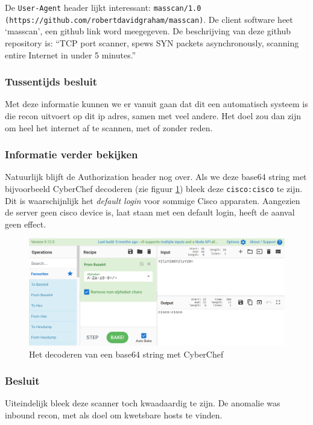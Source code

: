 \documentclass[a4paper,12pt]{report}
\begin{document}
De \lstinline|User-Agent| header lijkt interessant: \lstinline|masscan/1.0 (https://github.com/robertdavidgraham/masscan)|.
De client software heet `masscan', een github link word meegegeven.
De beschrijving van deze github repository is: ``TCP port scanner, spews SYN packets asynchronously, scanning entire Internet in under 5 minutes.''

\subsubsection{Tussentijds besluit}
Met deze informatie kunnen we er vanuit gaan dat dit een automatisch systeem is die recon uitvoert op dit ip adres, samen met veel andere.
Het doel zou dan zijn om heel het internet af te scannen, met of zonder reden.

\subsubsection{Informatie verder bekijken}
Natuurlijk blijft de Authorization header nog over.
Als we deze base64 string met bijvoorbeeld CyberChef decoderen (zie figuur \ref{fig:analyse-masscan-cyberchef}) bleek deze \lstinline|cisco:cisco| te zijn.
Dit is waarschijnlijk het \emph{default login} voor sommige Cisco apparaten.
Aangezien de server geen cisco device is, laat staan met een default login, heeft de aanval geen effect.

\begin{figure}[H]
  \centering
  \includegraphics[width=\textwidth]{analyse-masscan-cyberchef}
  \caption{Het decoderen van een base64 string met CyberChef}
  \label{fig:analyse-masscan-cyberchef}
\end{figure}

\subsubsection{Besluit}
Uiteindelijk bleek deze scanner toch kwaadaardig te zijn.
De anomalie was inbound recon, met als doel om kwetsbare hosts te vinden.
\end{document}
